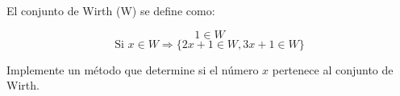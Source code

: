  El conjunto de Wirth (W) se define como:

\[ 1 \in W \]
\[ \text{Si } x \in W \Rightarrow \{ 2x + 1 \in W, 3x + 1 \in W \} \]

Implemente un método que determine si el número \( x \) pertenece al conjunto de Wirth.

